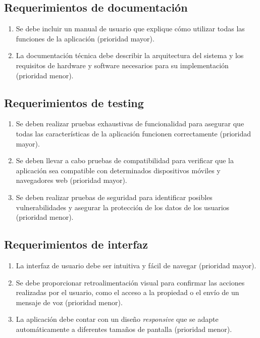 \documentclass[
11pt, %
codirector, %
]{charter}
\begin{document}
\subsection{Requerimientos de documentación}
\begin{enumerate}
\item Se debe incluir un manual de usuario que explique cómo utilizar todas las funciones de la aplicación (prioridad mayor).
\item La documentación técnica debe describir la arquitectura del sistema y los requisitos de hardware y software necesarios para su implementación (prioridad menor).
\end{enumerate}

\subsection{Requerimientos de testing}
\begin{enumerate}
\item Se deben realizar pruebas exhaustivas de funcionalidad para asegurar que todas las características de la aplicación funcionen correctamente (prioridad mayor).
\item Se deben llevar a cabo pruebas de compatibilidad para verificar que la aplicación sea compatible con determinados dispositivos móviles y navegadores web (prioridad mayor).
\item Se deben realizar pruebas de seguridad para identificar posibles vulnerabilidades y asegurar la protección de los datos de los usuarios (prioridad menor).
\end{enumerate}

\subsection{Requerimientos de interfaz}
\begin{enumerate}
\item La interfaz de usuario debe ser intuitiva y fácil de navegar (prioridad mayor).
\item Se debe proporcionar retroalimentación visual para confirmar las acciones realizadas por el usuario, como el acceso a la propiedad o el envío de un mensaje de voz (prioridad menor).
\item La aplicación debe contar con un diseño \textit{responsive} que se adapte automáticamente a diferentes tamaños de pantalla (prioridad menor).
\end{enumerate}
\end{document}

